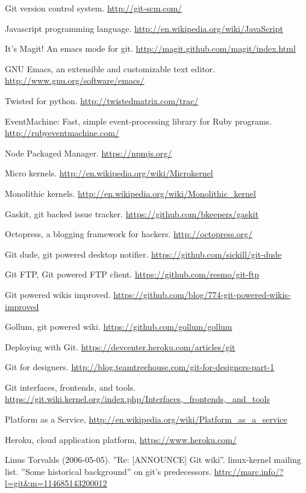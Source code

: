\cleardoublepage
{}
{}
\begin{thebibliography}{99}

 Git version control system.
  \url{http://git-scm.com/}

 Javascript programming language.
  \url{http://en.wikipedia.org/wiki/JavaScript}

 It's Magit! An emacs mode for git.
  \url{http://magit.github.com/magit/index.html}

 GNU Emacs, an extensible and customizable text editor.
  \url{http://www.gnu.org/software/emacs/}

 Twisted for python.
  \url{http://twistedmatrix.com/trac/}

 EventMachine: Fast, simple event-processing library for
  Ruby programs. \url{http://rubyeventmachine.com/}

 Node Packaged Manager.
  \url{https://npmjs.org/}

 Micro kernels.
  \url{http://en.wikipedia.org/wiki/Microkernel}

 Monolithic kernels.
  \url{http://en.wikipedia.org/wiki/Monolithic_kernel}

 Gaskit, git backed issue tracker.
  \url{https://github.com/bkeepers/gaskit}

 Octopress, a blogging framework for hackers.
  \url{http://octopress.org/}

 Git dude, git powered desktop notifier.
  \url{https://github.com/sickill/git-dude}

 Git FTP, Git powered FTP client.
  \url{https://github.com/resmo/git-ftp}

 Git powered wikis improved.
  \url{https://github.com/blog/774-git-powered-wikis-improved}

 Gollum, git powered wiki.
  \url{https://github.com/gollum/gollum}

 Deploying with Git.
  \url{https://devcenter.heroku.com/articles/git}

 Git for designers.
  \url{http://blog.teamtreehouse.com/git-for-designers-part-1}

 Git interfaces, frontends, and tools.
  \url{https://git.wiki.kernel.org/index.php/Interfaces,_frontends,_and_tools}

 Platform as a Service,
  \url{http://en.wikipedia.org/wiki/Platform_as_a_service}

 Heroku, cloud application platform,
  \url{https://www.heroku.com/}

 Linus Torvalds (2006-05-05). ”Re: [ANNOUNCE] Git wiki”.
  linux-kernel mailing list. ”Some historical background” on git’s predecessors.
  \url{http://marc.info/?l=git\&m=114685143200012}


\end{thebibliography}
